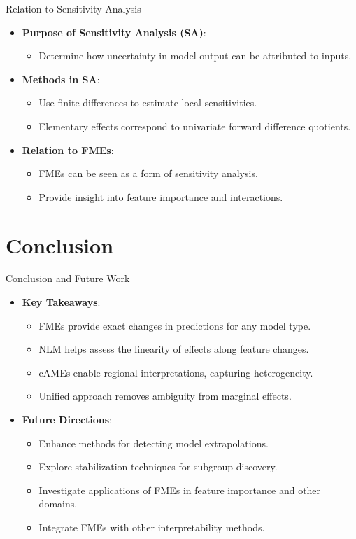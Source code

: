 \documentclass[11pt,compress,t,notes=noshow, aspectratio=169, xcolor=table]{beamer}
\begin{document}
\begin{frame}{Relation to Sensitivity Analysis}
\begin{itemize}
\item \textbf{Purpose of Sensitivity Analysis (SA)}:
\begin{itemize}
\item Determine how uncertainty in model output can be attributed to inputs.
\end{itemize}
\item \textbf{Methods in SA}:
\begin{itemize}
\item Use finite differences to estimate local sensitivities.
\item Elementary effects correspond to univariate forward difference quotients.
\end{itemize}
\item \textbf{Relation to FMEs}:
\begin{itemize}
\item FMEs can be seen as a form of sensitivity analysis.
\item Provide insight into feature importance and interactions.
\end{itemize}
\end{itemize}
\end{frame}

\section{Conclusion}

\begin{frame}{Conclusion and Future Work}
\begin{itemize}
\item \textbf{Key Takeaways}:
\begin{itemize}
  \item FMEs provide exact changes in predictions for any model type.
  \item NLM helps assess the linearity of effects along feature changes.
  \item cAMEs enable regional interpretations, capturing heterogeneity.
  \item Unified approach removes ambiguity from marginal effects.
\end{itemize}
\item \textbf{Future Directions}:
\begin{itemize}
  \item Enhance methods for detecting model extrapolations.
  \item Explore stabilization techniques for subgroup discovery.
  \item Investigate applications of FMEs in feature importance and other domains.
  \item Integrate FMEs with other interpretability methods.
\end{itemize}
\end{itemize}
\end{frame}
\end{document}
